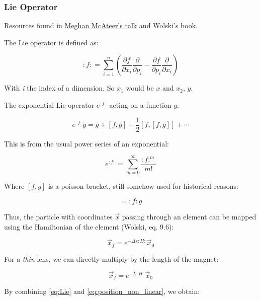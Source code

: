 \hypertarget{lie-operator}{%
\subsubsection{Lie Operator}\label{lie-operator}}

Resources found in
\href{https://mlegarre.web.cern.ch/mlegarre/Courses/Meghan_RDTpresentation.pdf}{Meghan
McAteer's talk} and Wolski's book.

The Lie operator is defined as:

\[
\colon f \colon = \sum^n_{i=1} \left(\frac{\partial f}{\partial x_i} \frac{\partial}{\partial p_i} 
                           - \frac{\partial f}{\partial p_i} \frac{\partial}{\partial x_i}
                      \right)
\]

With \emph{i} the index of a dimension. So \(x_1\) would be \(x\) and
\(x_2\), \(y\).

The exponential Lie operator \(e^{:f:}\) acting on a function \(g\):

\begin{equation}e^{:f:}g = g + [f, g] + \frac{1}{2} [f, [f, g]] + \cdots\label{eq:Lie}\end{equation}

This is from the usual power series of an exponential:

\[e^{:f:} = \sum^{\infty}_{m=0} \frac{:f:^m}{m!}\]

Where \([f, g]\) is a poisson bracket, still somehow used for historical
reasons:

\begin{equation}[f, g] = \colon f \colon g
\label{eq:poisson_bracket}\end{equation}

Thus, the particle with coordinates \(\vec{x}\) passing through an
element can be mapped using the Hamiltonian of the element (Wolski, eq.
9.6):

\begin{equation}\vec{x}_f = e^{-\Delta s:H:} \vec{x}_0\label{eq:position_non_linear}\end{equation}

For a \emph{thin} lens, we can directly multiply by the length of the
magnet:

\begin{equation}\vec{x}_f = e^{-L:H:} \vec{x}_0\label{eq:position_non_linear_thin}\end{equation}

By combining \cref{eq:Lie} and \cref{eq:position_non_linear}, we obtain:

